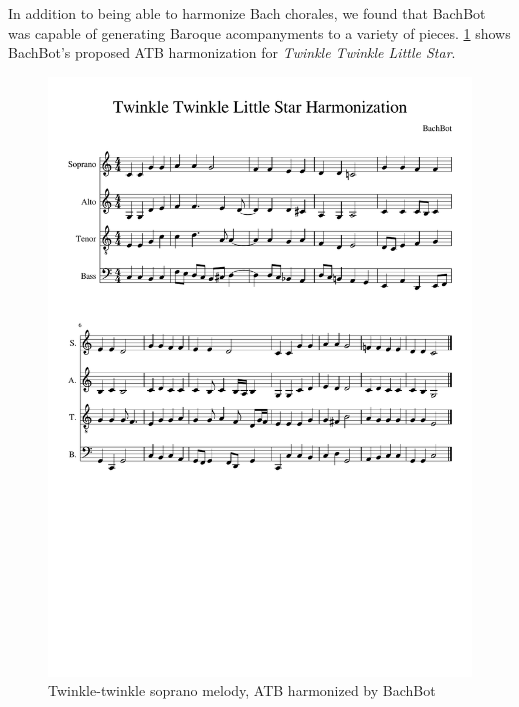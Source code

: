 In addition to being able to harmonize Bach chorales, we found that BachBot was
capable of generating Baroque acompanyments to a variety of pieces.
\cref{fig:harm-twinkle-twinkle} shows BachBot's proposed ATB harmonization for
\textit{Twinkle Twinkle Little Star}.

\begin{figure}[tb]
  \centering
  \includegraphics[trim={0 10cm 0 3.7cm},clip,width=0.9\linewidth]{twinkle-twinkle-score.pdf}
  \caption{Twinkle-twinkle soprano melody, ATB harmonized by BachBot}
  \label{fig:harm-twinkle-twinkle}
\end{figure}

